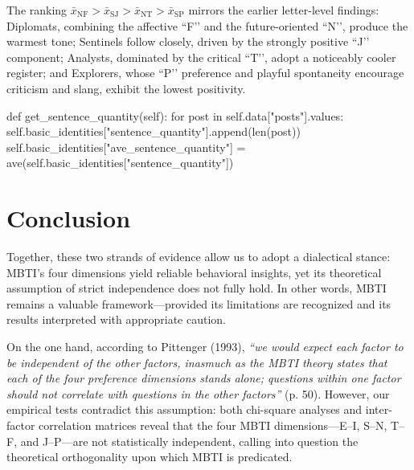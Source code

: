 \documentclass[12pt]{article}
\numberwithin{figure}{section}  %
\begin{document}
	The ranking $\bar{x}_{\text{NF}}>\bar{x}_{\text{SJ}}>\bar{x}_{\text{NT}}>\bar{x}_{\text{SP}}$ mirrors the earlier letter-level findings: Diplomats, combining the affective “F’’ and the future-oriented “N’’, produce the warmest tone; Sentinels follow closely, driven by the strongly positive “J’’ component; Analysts, dominated by the critical “T’’, adopt a noticeably cooler register; and Explorers, whose “P’’ preference and playful spontaneity encourage criticism and slang, exhibit the lowest positivity. 
	


	
	

	\begin{python}
def get_sentence_quantity(self):
    for post in self.data["posts"].values:
        self.basic_identities["sentence_quantity"].append(len(post))
    self.basic_identities["ave_sentence_quantity"] = ave(self.basic_identities["sentence_quantity"])
	\end{python}
	
\section{Conclusion}	
Together, these two strands of evidence allow us to adopt a dialectical stance: 
MBTI’s four dimensions yield reliable behavioral insights, yet its theoretical assumption of strict independence does not fully hold. 
In other words, MBTI remains a valuable framework—provided its limitations are recognized and its results interpreted with appropriate caution.

On the one hand, according to Pittenger (1993), \textit{“we would expect each factor to be independent of the other factors, inasmuch as the MBTI theory states that each of the four preference dimensions stands alone;
 questions within one factor should not correlate with questions in the other factors” }(p. 50). However, our empirical tests contradict this assumption: both chi-square analyses and inter-factor correlation matrices reveal that the four MBTI dimensions—E–I, S–N, T–F, and J–P—are not statistically independent, calling into question the theoretical orthogonality upon which MBTI is predicated.


	
	
\end{document}
